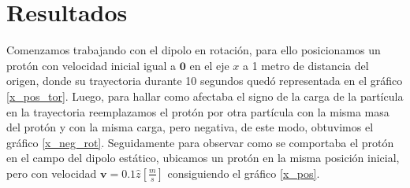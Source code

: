 \documentclass{article}
\begin{document}

























\section*{Resultados}

Comenzamos trabajando con el dipolo en rotación, para ello posicionamos un protón con velocidad inicial igual a $\textbf{0}$ en el eje $x$ a 1 metro de distancia del origen, donde su trayectoria durante 10 segundos quedó representada en el gráfico \ref{x_pos_tor}. Luego, para hallar como afectaba el signo de la carga de la partícula en la trayectoria reemplazamos el protón por otra partícula con la misma masa del protón y con la misma carga, pero negativa, de este modo, obtuvimos el gráfico \ref{x_neg_rot}. Seguidamente para observar como se comportaba el protón en el campo del dipolo estático, ubicamos un protón en la misma posición inicial, pero con velocidad $\textbf{v} =0.1\hat{z} \left[ \frac{m}{s} \right]$ consiguiendo el gráfico \ref{x_pos}.
\end{document}
